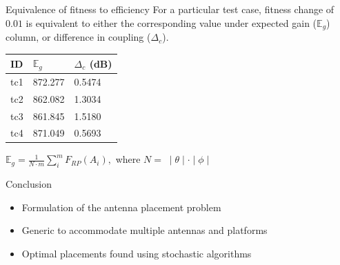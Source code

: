 \documentclass{beamer}
\begin{document}
        \begin{frame}{Equivalence of fitness to efficiency}
            \small For a particular test case, fitness change of $0.01$ is equivalent to either the corresponding value under expected gain ($\mathbb E_g$) column, or difference in coupling ($\Delta_c$).
            \begin{table}
                \centering
                \begin{threeparttable}
                    \begin{tabular}{|C{1cm}|C{2.5cm}|C{2.5cm}|} \hline
                        ID& $\mathbb E_g$ & $\Delta_{c}$ (dB) \\ \hline
                        tc1 & 872.277 & 0.5474 \\ \hline
                        tc2 & 862.082 & 1.3034 \\ \hline
                        tc3 & 861.845 & 1.5180 \\ \hline
                        tc4 & 871.049 & 0.5693 \\
                        \hline\end{tabular}
                \end{threeparttable}
            \end{table}
            \tiny
            $\mathbb E_g = \frac{1}{N \cdot m} \sum_{i}^m F_{RP}(A_i),$
            where $N = \;\mid \theta \mid \cdot \mid \phi \mid$
        \end{frame}

        \begin{frame}[t]{Conclusion}
            \begin{itemize}
                \item Formulation of the antenna placement problem
                \item Generic to accommodate multiple antennas and platforms
                \item Optimal placements found using stochastic algorithms
            \end{itemize}
        \end{frame}

        
\end{document}
